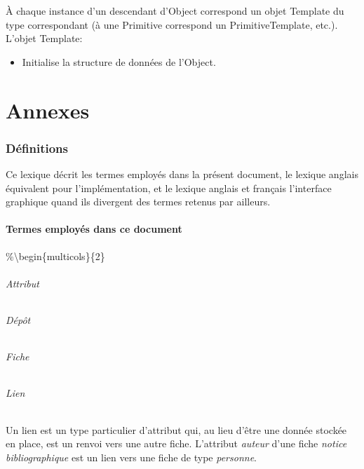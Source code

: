 \documentclass[11pt]{article}
\begin{document}
À chaque instance d'un descendant d'Object correspond un objet Template
du type correspondant (à une Primitive correspond un PrimitiveTemplate,
etc.). L'objet Template:

\begin{itemize}
\itemsep1pt\parskip0pt
\item
  Initialise la structure de données de l'Object.
\end{itemize}

\appendix

\part{Annexes}

\section{Définitions}\label{duxe9finitions}

Ce lexique décrit les termes employés dans la présent document, le
lexique anglais équivalent pour l'implémentation, et le lexique anglais
et français l'interface graphique quand ils divergent des termes retenus
par ailleurs.

\subsection{Termes employés dans ce
document}\label{termes-employuxe9s-dans-ce-document}

\%\textbackslash{}begin\{multicols\}\{2\}

\paragraph{Attribut}\label{attribut}

\paragraph{Dépôt}\label{duxe9puxf4t}

\paragraph{Fiche}\label{fiche}

\paragraph{Lien}\label{lien}

Un lien est un type particulier d'attribut qui, au lieu d'être une
donnée stockée en place, est un renvoi vers une autre fiche. L'attribut
\emph{auteur }d'une fiche \emph{notice bibliographique} est un lien vers
une fiche de type \emph{personne}.
\end{document}
